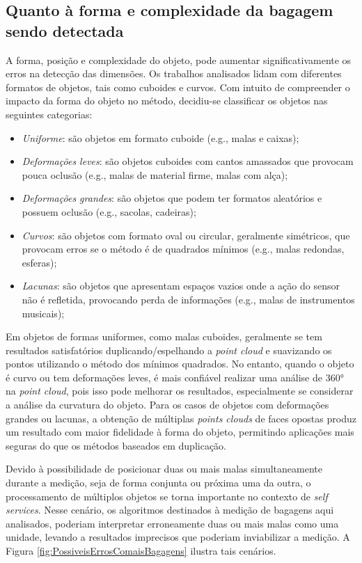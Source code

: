 \subsection{Quanto à forma e complexidade da bagagem sendo detectada}
\label{subsec_Quanto à forma e complexidade da bagagem sendo detectada}

    A forma, posição e complexidade do objeto, pode aumentar significativamente os erros na detecção das dimensões. Os trabalhos analisados lidam com diferentes formatos de objetos, tais como cuboides e curvos. Com intuito de compreender o impacto da forma do objeto no método, decidiu-se classificar os objetos nas seguintes categorias:
    
    \begin{itemize}
        \item \textit{Uniforme}: são objetos em formato cuboide (e.g., malas e caixas); 
        \item \textit{Deformações leves}: são objetos cuboides com cantos amassados que provocam pouca oclusão (e.g., malas de material firme, malas com alça); 
        \item \textit{Deformações grandes}: são objetos que podem ter formatos aleatórios e possuem oclusão (e.g., sacolas, cadeiras); 
        \item \textit{Curvos}: são objetos com formato oval ou circular, geralmente simétricos, que provocam erros se o método é de quadrados mínimos (e.g., malas redondas, esferas);
        \item \textit{Lacunas}: são objetos que apresentam espaços vazios onde a ação do sensor não é refletida, provocando perda de informações (e.g., malas de instrumentos musicais); 
    \end{itemize}

    Em objetos de formas uniformes, como malas cuboides, geralmente se tem resultados satisfatórios duplicando/espelhando a \textit{point cloud } e suavizando os pontos utilizando o método dos mínimos quadrados. No entanto, quando o objeto é curvo ou tem deformações leves, é mais confiável realizar uma análise de 360° na \textit{point cloud}, pois isso pode melhorar os resultados, especialmente se considerar a análise da curvatura do objeto. Para os casos de objetos com deformações grandes ou lacunas, a obtenção de múltiplas \textit{points clouds} de faces opostas produz um resultado com maior fidelidade à forma do objeto, permitindo aplicações mais seguras do que os métodos baseados em duplicação.
    
    Devido à possibilidade de posicionar duas ou mais malas simultaneamente durante a medição, seja de forma conjunta ou próxima uma da outra, o processamento de múltiplos objetos se torna importante no contexto de \textit{self services}. Nesse cenário, os algoritmos destinados à medição de bagagens aqui analisados, poderiam interpretar erroneamente duas ou mais malas como uma unidade, levando a resultados imprecisos que poderiam inviabilizar a medição. A Figura \ref{fig:PossiveisErrosComaisBagagens} ilustra tais cenários.
    
